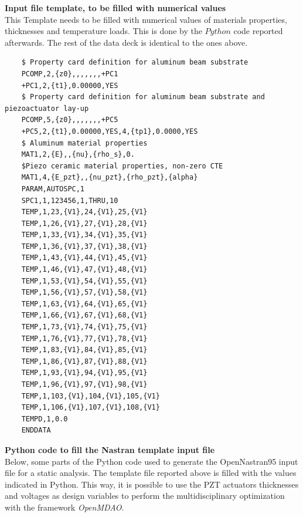 \documentclass[twocolumn,a4paper,10pt,english]{article}
\begin{document}
\medskip
\textbf{Input file template, to be filled with numerical values}\\
This Template needs to be filled with numerical values of materials properties, thicknesses and temperature loads. This is done by the $Python$ code reported afterwards. The rest of the data deck is identical to the ones above.
\begin{verbatim}
	$ Property card definition for aluminum beam substrate
	PCOMP,2,{z0},,,,,,,+PC1
	+PC1,2,{t1},0.00000,YES
	$ Property card definition for aluminum beam substrate and piezoactuator lay-up
	PCOMP,5,{z0},,,,,,,+PC5
	+PC5,2,{t1},0.00000,YES,4,{tp1},0.0000,YES
	$ Aluminum material properties
	MAT1,2,{E},,{nu},{rho_s},0.
	$Piezo ceramic material properties, non-zero CTE
	MAT1,4,{E_pzt},,{nu_pzt},{rho_pzt},{alpha}
	PARAM,AUTOSPC,1 
	SPC1,1,123456,1,THRU,10
	TEMP,1,23,{V1},24,{V1},25,{V1}
	TEMP,1,26,{V1},27,{V1},28,{V1}
	TEMP,1,33,{V1},34,{V1},35,{V1}
	TEMP,1,36,{V1},37,{V1},38,{V1}
	TEMP,1,43,{V1},44,{V1},45,{V1}
	TEMP,1,46,{V1},47,{V1},48,{V1}
	TEMP,1,53,{V1},54,{V1},55,{V1}
	TEMP,1,56,{V1},57,{V1},58,{V1}
	TEMP,1,63,{V1},64,{V1},65,{V1}
	TEMP,1,66,{V1},67,{V1},68,{V1}
	TEMP,1,73,{V1},74,{V1},75,{V1}
	TEMP,1,76,{V1},77,{V1},78,{V1}
	TEMP,1,83,{V1},84,{V1},85,{V1}
	TEMP,1,86,{V1},87,{V1},88,{V1}
	TEMP,1,93,{V1},94,{V1},95,{V1}
	TEMP,1,96,{V1},97,{V1},98,{V1}
	TEMP,1,103,{V1},104,{V1},105,{V1}
	TEMP,1,106,{V1},107,{V1},108,{V1}
	TEMPD,1,0.0
	ENDDATA
\end{verbatim}
\medskip
\textbf{Python code to fill the Nastran template input file}\\
Below, some parts of the Python code used to generate the OpenNastran95 input file for a static analysis. The template file reported above is filled with the values indicated in Python. This way, it is possible to use the PZT actuators thicknesses and voltages as design variables to perform the multidisciplinary optimization with the framework \textit{OpenMDAO}.
\end{document}
